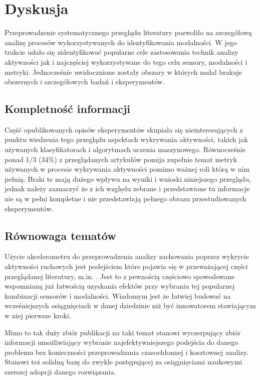 \pagebreak
\section{Dyskusja}
Przeprowadzenie systematycznego przeglądu literatury pozwoliło na szczegółową analizę procesów wykorzystywanych do identyfikowania modalności. W jego trakcie udało się zidentyfikować popularne cele zastosowania technik analizy aktywności jak i najczęściej wykorzystywane do tego celu sensory, modalności i metryki. Jednocześnie uwidocznione zostały obszary w których nadal brakuje obszernych i szczegółowych badań i eksperymentów.

\subsection{Kompletność informacji}
Część opublikowanych opisów eksperymentów skupiała się nieinteresujących z punktu wiedzenia tego przeglądu aspektach wykrywania aktywności, takich jak używanych klasyfikatorach i algorytmach uczenia maszynowego. Równocześnie ponad 1/3 (34\%) z przeglądanych artykułów pomija zupełnie temat metryk używanych w procesie wykrywania aktywności pomimo ważnej roli którą w nim pełnią. Braki te mają dużego wpływu na wyniki i wnioski niniejszego przeglądu, jednak należy zaznaczyć że z ich względu zebrane i przedstawione tu informacje nie są w pełni kompletne i nie przedstawiają pełnego obrazu przestudiowanych eksperymentów. 

\subsection{Równowaga tematów}
\label{sec:article_balance}
Użycie akcelerometru do przeprowadzenia analizy zachowania poprzez wykrycie aktywności ruchowych jest podejściem które pojawia się w przeważającej części przeglądanej literatury, m.in. \cite{S59, S33, S29, S30, S32, S42}. Jest to z pewnością częściowo spowodowane wspomnianą już łatwością uzyskania efektów przy wybraniu tej popularnej kombinacji sensorów i modalności. Wiadomym jest że łatwiej budować na wcześniejszych osiągnięciach w danej dziedzinie niż być innowatorem stawiającym w niej pierwsze kroki. 

Mimo to tak duży zbiór publikacji na taki temat stanowi wyczerpujący zbiór informacji umożliwiający wybranie najefektywniejszego podejścia do danego problemu bez konieczności przeprowadzania czasochłonnej i kosztownej analizy. Stanowi też solidną bazę do zwykle postępującej za osiągnięciami naukowymi szerszej adopcji danego rozwiązania.

